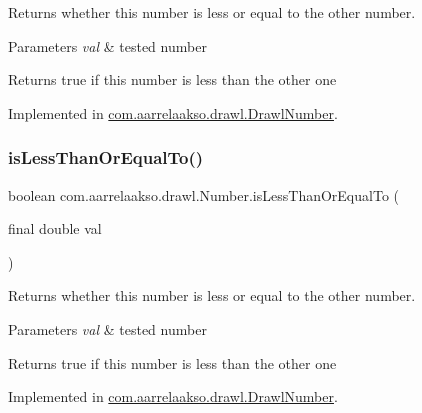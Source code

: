 Returns whether this number is less or equal to the other number. 


\begin{DoxyParams}{Parameters}
{\em val} & tested number \\
\hline
\end{DoxyParams}
\begin{DoxyReturn}{Returns}
true if this number is less than the other one 
\end{DoxyReturn}


Implemented in \hyperlink{classcom_1_1aarrelaakso_1_1drawl_1_1_drawl_number_af3936483f84eec933c41b7dc78bb473a}{com.\+aarrelaakso.\+drawl.\+Drawl\+Number}.

\mbox{\label{interfacecom_1_1aarrelaakso_1_1drawl_1_1_number_a99ddc795a01b241e97345cfd6b85e00b}} 
\subsubsection{\texorpdfstring{is\+Less\+Than\+Or\+Equal\+To()}{isLessThanOrEqualTo()}\hspace{0.1cm}{\footnotesize\ttfamily [2/2]}}
{\footnotesize\ttfamily boolean com.\+aarrelaakso.\+drawl.\+Number.\+is\+Less\+Than\+Or\+Equal\+To (\begin{DoxyParamCaption}\item[{final double}]{val }\end{DoxyParamCaption})}



Returns whether this number is less or equal to the other number. 


\begin{DoxyParams}{Parameters}
{\em val} & tested number \\
\hline
\end{DoxyParams}
\begin{DoxyReturn}{Returns}
true if this number is less than the other one 
\end{DoxyReturn}


Implemented in \hyperlink{classcom_1_1aarrelaakso_1_1drawl_1_1_drawl_number_af112edcaa36d2518baab553fe11d39fe}{com.\+aarrelaakso.\+drawl.\+Drawl\+Number}.

